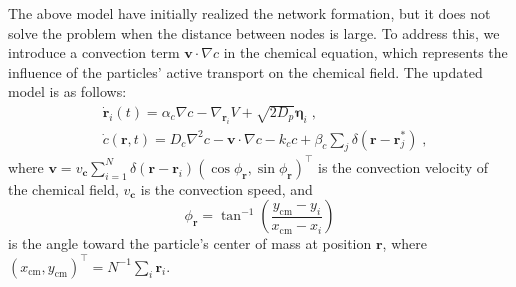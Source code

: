 \documentclass{article}
\begin{document}
The above model have initially realized the network formation, but it does not solve the problem when the distance between nodes is large. To address this, we introduce a convection term $\mathbf{v}\cdot \nabla c$ in the chemical equation, which represents the influence of the particles' active transport on the chemical field. The updated model is as follows:
\begin{subequations}
    \begin{align}
        &\dot{\mathbf{r}}_i\left( t \right) =\alpha _c\nabla c-\nabla _{\mathbf{r}_i}V+\sqrt{2D_p}\boldsymbol{\eta }_i\;,\\
        &\dot{c}\left( \mathbf{r},t \right) =D_c\nabla ^2c-\mathbf{v}\cdot \nabla c-k_c c+\beta _c\sum\nolimits_j^{}{\delta \left( \mathbf{r}-\mathbf{r}_{j}^{*} \right) }\;,
    \end{align}
\end{subequations}
where $\mathbf{v}=v_{\boldsymbol{c}}\sum_{i=1}^N{\delta \left( \mathbf{r}-\mathbf{r}_i \right)\left( \cos \phi _{\mathbf{r}}, \sin \phi _{\mathbf{r}} \right) ^{\top}}$ is the convection velocity of the chemical field, $v_{\boldsymbol{c}}$ is the convection speed, and 
\begin{equation}
    \phi _{\mathbf{r}}= \tan^{-1} \left( \frac{y_{\mathrm{cm}}-y_i}{x_{\mathrm{cm}}-x_i} \right)
\end{equation}
is the angle toward the particle's center of mass at position $\mathbf{r}$, where $\left( x_{\mathrm{cm}},y_{\mathrm{cm}} \right) ^{\top}=N^{-1}\sum\nolimits_i^{}{\mathbf{r}_i}$.
\end{document}
